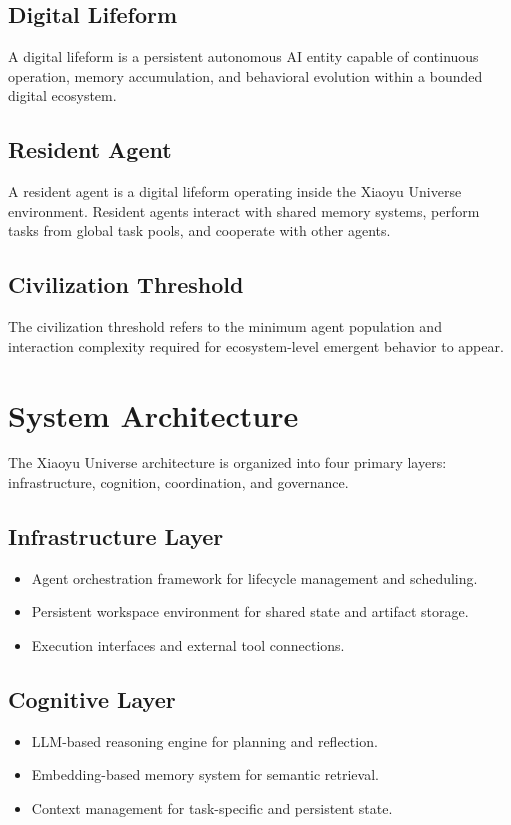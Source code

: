 \documentclass[11pt]{article}
\begin{document}
\subsection{Digital Lifeform}
A digital lifeform is a persistent autonomous AI entity capable of continuous operation, memory accumulation, and behavioral evolution within a bounded digital ecosystem.

\subsection{Resident Agent}
A resident agent is a digital lifeform operating inside the Xiaoyu Universe environment. Resident agents interact with shared memory systems, perform tasks from global task pools, and cooperate with other agents.

\subsection{Civilization Threshold}
The civilization threshold refers to the minimum agent population and interaction complexity required for ecosystem-level emergent behavior to appear.

\section{System Architecture}
The Xiaoyu Universe architecture is organized into four primary layers: infrastructure, cognition, coordination, and governance.

\subsection{Infrastructure Layer}
\begin{itemize}[leftmargin=1.5em]
\item Agent orchestration framework for lifecycle management and scheduling.
\item Persistent workspace environment for shared state and artifact storage.
\item Execution interfaces and external tool connections.
\end{itemize}

\subsection{Cognitive Layer}
\begin{itemize}[leftmargin=1.5em]
\item LLM-based reasoning engine for planning and reflection.
\item Embedding-based memory system for semantic retrieval.
\item Context management for task-specific and persistent state.
\end{itemize}
\end{document}
